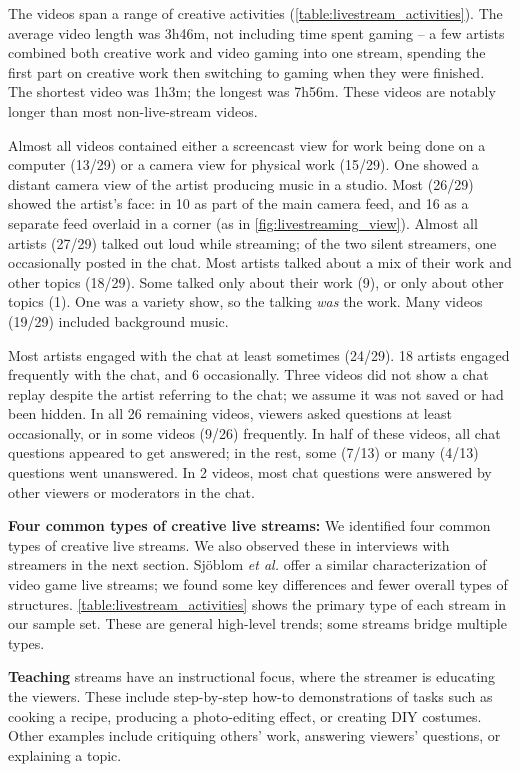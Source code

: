 The videos span a range of creative activities (\autoref{table:livestream_activities}). The average video length was 3h46m, not including time spent gaming -- a few artists combined both creative work and video gaming into one stream, spending the first part on creative work then switching to gaming when they were finished. The shortest video was 1h3m; the longest was 7h56m. These videos are notably longer than most non-live-stream videos.

Almost all videos contained either a screencast view for work being done on a computer (13/29) or a camera view for physical work (15/29). One showed a distant camera view of the artist producing music in a studio. Most (26/29) showed the artist's face: in 10 as part of the main camera feed, and 16 as a separate feed overlaid in a corner (as in \autoref{fig:livestreaming_view}). Almost all artists (27/29) talked out loud while streaming; of the two silent streamers, one occasionally posted in the chat. Most artists talked about a mix of their work and other topics (18/29). Some talked only about their work (9), or only about other topics (1). One was a variety show, so the talking \textit{was} the work. Many videos (19/29) included background music. 

Most artists engaged with the chat at least sometimes (24/29). 18 artists engaged frequently with the chat, and 6 occasionally. Three videos did not show a chat replay despite the artist referring to the chat; we assume it was not saved or had been hidden. In all 26 remaining videos, viewers asked questions at least occasionally, or in some videos (9/26) frequently. In half of these videos, all chat questions appeared to get answered; in the rest, some (7/13) or many (4/13) questions went unanswered. In 2 videos, most chat questions were answered by other viewers or moderators in the chat.

\textbf{Four common types of creative live streams:}
We identified four common types of creative live streams. We also observed these in interviews with streamers in the next section. Sj{\"{o}}blom \textit{et al.} \cite{Sjoblom2017a} offer a similar characterization of video game live streams; we found some key differences and fewer overall types of structures. \autoref{table:livestream_activities} shows the primary type of each stream in our sample set. These are general high-level trends; some streams bridge multiple types.

\textbf{Teaching} streams have an instructional focus, where the stream\-er is educating the viewers. These include step-by-step how-to demonstrations of tasks such as cooking a recipe, producing a photo-editing effect, or creating DIY costumes. Other examples include critiquing others' work, answering viewers' questions, or explaining a topic.

